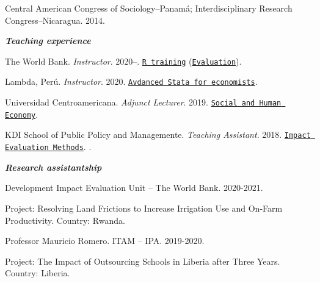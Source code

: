 \documentclass[11pt,article,oneside, a4paper]{memoir}
\begin{document}
\ind Central American Congress of Sociology–Panamá; Interdisciplinary Research Congress–Nicaragua. 2014. 

\medskip


\noindent\emph{\textbf{Teaching experience} \vspace{0.05in}}

\ind The World Bank. \emph{Instructor}. 2020--. \newline \texttt{\href{https://github.com/worldbank/dime-r-training}{R training}} (\texttt{\href{https://rrmaximiliano.github.io/docs/evaluation-esh.pdf}{Evaluation}}). 

\ind Lambda, Perú. \emph{Instructor}. 2020. \newline \texttt{\href{https://github.com/lambda-stata/course-materials}{Avdanced Stata for economists}}. 

\ind Universidad Centroamericana. \emph{Adjunct Lecturer}. 2019. \newline \texttt{\href{https://github.com/econsoc-uca}{Social and Human Economy}}.  

\ind KDI School of Public Policy and Managemente. \emph{Teaching Assistant}. 2018.  \newline \texttt{\href{https://www.dropbox.com/home/teaching_materials/kdischool/spring_2018_impact_evaluation}{Impact Evaluation Methods}}. \newline \texttt{\color{DarkSlateBlue}{Foundations of Sustainable Development}}. 

\medskip
\noindent\emph{\textbf{Research assistantship} \vspace{0.05in}}

\ind Development Impact Evaluation Unit -- The World Bank. 2020-2021.

\ind \hspace{0.35in} \footnotesize Project: Resolving Land Frictions to Increase Irrigation Use and On-Farm Productivity. \newline Country: Rwanda. \normalsize \vspace{0.01in}

\ind Professor Mauricio Romero. ITAM -- IPA. 2019-2020.

\ind \hspace{0.35in} \footnotesize Project: The Impact of Outsourcing Schools in Liberia after
Three Years. \newline Country: Liberia. \normalsize \vspace{0.01in}
\end{document}
